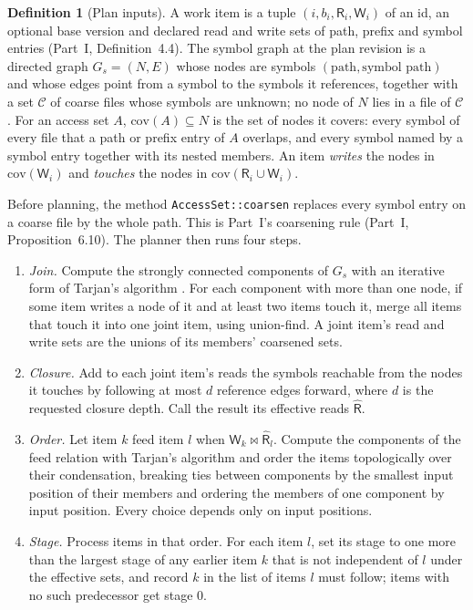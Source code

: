 \documentclass[11pt,letterpaper]{article}
\theoremstyle{definition}
\newtheorem{definition}[theorem]{Definition}
\theoremstyle{remark}
\newcommand{\R}{\mathsf{R}}
\newcommand{\W}{\mathsf{W}}
\DeclareRobustCommand{\code}[1]{{\def\_{\textunderscore\allowbreak}\texttt{#1}}}
\begin{document}
\begin{definition}[Plan inputs]
\label{def:pdd:plan}
A work item is a tuple $(i,b_i,\R_i,\W_i)$ of an id, an optional base version and declared read and write sets of path, prefix and symbol entries (Part~I, Definition~4.4). The symbol graph at the plan revision is a directed graph $G_s=(N,E)$ whose nodes are symbols $(\text{path},\text{symbol path})$ and whose edges point from a symbol to the symbols it references, together with a set $\mathcal{C}$ of coarse files whose symbols are unknown; no node of $N$ lies in a file of $\mathcal{C}$. For an access set $A$, $\mathrm{cov}(A)\subseteq N$ is the set of nodes it covers: every symbol of every file that a path or prefix entry of $A$ overlaps, and every symbol named by a symbol entry together with its nested members. An item \emph{writes} the nodes in $\mathrm{cov}(\W_i)$ and \emph{touches} the nodes in $\mathrm{cov}(\R_i\cup\W_i)$.
\end{definition}

Before planning, the method \code{AccessSet::coarsen} replaces every symbol entry on a coarse file by the whole path. This is Part~I's coarsening rule (Part~I, Proposition~6.10). The planner then runs four steps.
\begin{enumerate}
\item \emph{Join.} Compute the strongly connected components of $G_s$ with an iterative form of Tarjan's algorithm \cite{tarjan1972}. For each component with more than one node, if some item writes a node of it and at least two items touch it, merge all items that touch it into one joint item, using union-find. A joint item's read and write sets are the unions of its members' coarsened sets.
\item \emph{Closure.} Add to each joint item's reads the symbols reachable from the nodes it touches by following at most $d$ reference edges forward, where $d$ is the requested closure depth. Call the result its effective reads $\hat{\R}$.
\item \emph{Order.} Let item $k$ feed item $l$ when $\W_k\bowtie\hat{\R}_l$. Compute the components of the feed relation with Tarjan's algorithm and order the items topologically over their condensation, breaking ties between components by the smallest input position of their members and ordering the members of one component by input position. Every choice depends only on input positions.
\item \emph{Stage.} Process items in that order. For each item $l$, set its stage to one more than the largest stage of any earlier item $k$ that is not independent of $l$ under the effective sets, and record $k$ in the list of items $l$ must follow; items with no such predecessor get stage 0.
\end{enumerate}
\end{document}
